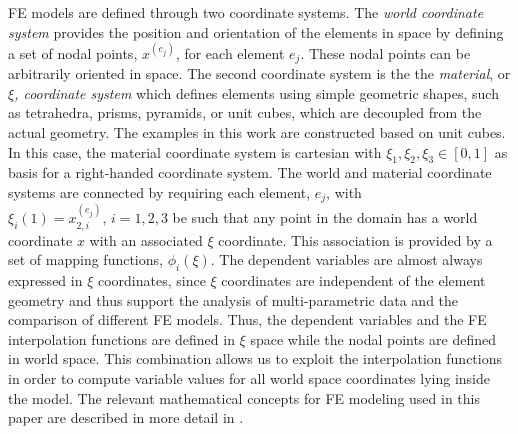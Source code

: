 \documentclass[journal]{vgtc}                %
\begin{document}
FE models are defined through two coordinate systems. The \emph{world coordinate system} provides the position and orientation of the elements in space by defining a set of nodal points, $x^{(e_j)}$, for each element $e_j$. These nodal points can be arbitrarily oriented in space. The second coordinate system is the the \emph{material}, or \emph{$\xi$, coordinate system} which defines elements using simple geometric shapes, such as tetrahedra, prisms, pyramids, or unit cubes, which are decoupled from the actual geometry. The examples in this work are constructed based on unit cubes. In this case, the material coordinate system is cartesian with $\xi_1, \xi_2, \xi_3 \in [0,1]$ as basis for a right-handed coordinate system. The world and material coordinate systems are connected by requiring each element, $e_j$, with $\xi_i(1)=x^{(e_j)}_{2,i},\, i=1,2,3$ be such that any point in the domain has a world coordinate $x$ with an associated $\xi$ coordinate. This association is provided by a set of mapping functions, $\phi_i(\xi)$. The dependent variables are almost always expressed in $\xi$ coordinates, since $\xi$ coordinates are independent of the element geometry and thus support the analysis of multi-parametric data and the comparison of different FE models. Thus, the dependent variables and the FE interpolation functions are defined in $\xi$ space while the nodal points are defined in world space. This combination allows us to exploit the interpolation functions in order to compute variable values for all world space coordinates lying inside the model. The relevant mathematical concepts for FE modeling used in this paper are described in more detail in \cite{wuensche03deformation,bradley97, szabo_book, schwab_book, karniadakis_book}.
%
\end{document}
